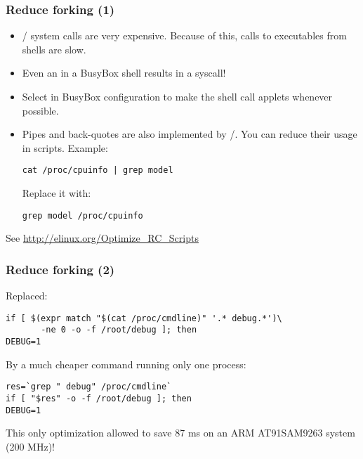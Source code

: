 \begin{frame}[fragile]
\frametitle{Reduce forking (1)}
\begin{itemize}
\item {}/ system calls are very expensive.
      Because of this, calls to executables from shells are slow.
\item Even an  in a BusyBox shell results in a 
syscall!
\item Select  in BusyBox
      configuration to make the shell call applets whenever possible.
\item Pipes and back-quotes are also implemented by
      /.  You can reduce their usage in
      scripts. Example:
      \begin{block}{}
      \begin{verbatim}
cat /proc/cpuinfo | grep model
      \end{verbatim}
      \end{block}
Replace it with:
      \begin{block}{}
      \begin{verbatim}
grep model /proc/cpuinfo
      \end{verbatim}
      \end{block}
\end{itemize}
See \url{http://elinux.org/Optimize_RC_Scripts}
\end{frame}

\begin{frame}[fragile]
\frametitle{Reduce forking (2)}
Replaced:
\begin{block}{}
\begin{verbatim}
if [ $(expr match "$(cat /proc/cmdline)" '.* debug.*')\
       -ne 0 -o -f /root/debug ]; then
DEBUG=1
\end{verbatim}
\end{block}
By a much cheaper command running only one process:
\begin{block}{}
\begin{verbatim}
res=`grep " debug" /proc/cmdline`
if [ "$res" -o -f /root/debug ]; then
DEBUG=1
\end{verbatim}
\end{block}
This only optimization allowed to save 87 ms on an ARM AT91SAM9263
system (200 MHz)!
\end{frame}



